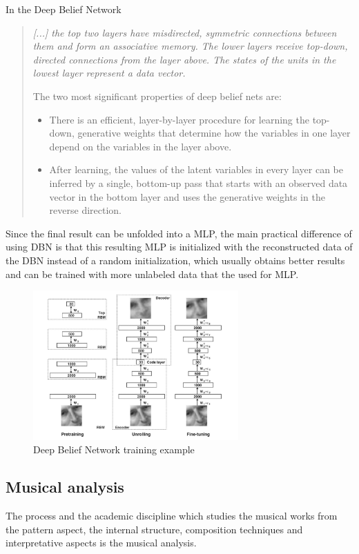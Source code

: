 \documentclass[a4paper,openany,oneside,12pt]{book}
\begin{document}
In the Deep Belief Network
\begin{quote}
\em [...] the top two layers have misdirected, symmetric connections between them and form an associative memory. The lower layers receive top-down, directed connections from the layer above. The states of the units in the lowest layer represent a data vector.

The two most significant properties of deep belief nets are:

\begin{itemize}
\item There is an efficient, layer-by-layer procedure for learning the top-down, generative weights that determine how the variables in one layer depend on the variables in the layer above. 

\item After learning, the values of the latent variables in every layer can be inferred by a single, bottom-up pass that starts with an observed data vector in the bottom layer and uses the generative weights in the reverse direction.\cite{Hinton:2009}
\end{itemize}
\end{quote}

Since the final result can be unfolded into a MLP, the main practical difference of using DBN is that this resulting MLP is initialized with the reconstructed data of the DBN instead of a random initialization, which usually obtains better results and can be trained with more unlabeled data that the used for MLP.


\begin{figure}
\centering
\includegraphics[width=0.7\textwidth]{img/dbn_model.png} 
\caption{Deep Belief Network training example\cite{rparedesNN}} \label{fig:dbn}
\end{figure}


\subsection{Musical analysis}\label{musical_analysis}
The process and the academic discipline which studies the musical works from the pattern aspect, the internal structure, composition techniques and interpretative aspects is the musical analysis.
\end{document}
